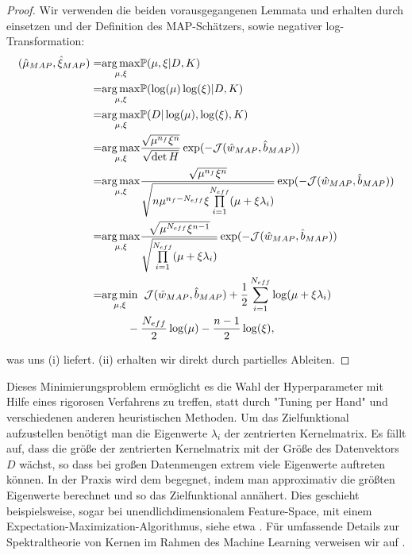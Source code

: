 \documentclass{report}
\theoremstyle{linebreak}
\begin{document}
\begin{proof}
Wir verwenden die beiden vorausgegangenen Lemmata und erhalten durch einsetzen und der Definition des MAP-Schätzers, sowie negativer log-Transformation:
\begin{align*}
	(\hat{\mu}_{MAP}, \hat{\xi}_{MAP}) 
	=& \underset{\mu, \xi}{\arg \max} \mathbb{P}(\mu, \xi \vert D, K) \\
	=& \underset{\mu, \xi}{\arg \max} \mathbb{P}(\log(\mu) \log(\xi) \vert D, K) \\
	=& \underset{\mu, \xi}{\arg \max} \mathbb{P}(D \vert \log(\mu), \log(\xi), K) \\
	=& \underset{\mu, \xi}{\arg \max} \frac{\sqrt{\mu^{n_f} \xi^n}}	{\sqrt{\det H}} 				\exp(- \mathcal{J}(\hat{w}_{MAP},\hat{b}_{MAP})) \\
	=& \underset{\mu, \xi}{\arg \max} \frac{\sqrt{\mu^{n_f} \xi^n}}	{\sqrt{n \mu^{n_f - 			N_{eff}} \xi \underset{i=1}{\overset{N_{eff}}{\prod}}(\mu + 			\xi 				\lambda_i)}} \exp(- \mathcal{J}(\hat{w}_{MAP},\hat{b}_{MAP})) \\
	=& \underset{\mu, \xi}{\arg \max} \frac{\sqrt{\mu^{N_{eff}} \xi^{n-1}}}	{\sqrt{ 				\underset{i=1}{\overset{N_{eff}}{\prod}}(\mu + 	\xi	\lambda_i)}} \exp(- 					\mathcal{J}(\hat{w}_{MAP},\hat{b}_{MAP})) \\
	=& \underset{\mu, \xi}{\arg \min}  \hspace{0.2cm} \mathcal{J}(\hat{w}_{MAP}, 			   	 	\hat{b}_{MAP}) + \frac{1}{2}\sum_{i=1}^{N_{eff}}\log(\mu + \xi \lambda_i)\\
	 & \hspace{0.8cm}- \frac{N_{eff}}{2}\log(\mu) - \frac{n -1 }{2}\log(\xi),
\end{align*}

was uns (i) liefert. (ii) erhalten wir direkt durch partielles Ableiten.

\end{proof}

Dieses Minimierungsproblem ermöglicht es die Wahl der Hyperparameter mit Hilfe eines rigorosen Verfahrens zu treffen, statt durch "Tuning per Hand" und verschiedenen anderen heuristischen Methoden. Um das Zielfunktional aufzustellen benötigt man die Eigenwerte $\lambda_i$ der zentrierten Kernelmatrix. Es fällt auf, dass die größe der zentrierten Kernelmatrix mit der Größe des Datenvektors $D$ wächst, so dass bei großen Datenmengen extrem viele Eigenwerte auftreten können. In der Praxis wird dem begegnet, indem man approximativ die größten Eigenwerte berechnet und so das Zielfunktional annähert. Dies geschieht beispielsweise, sogar bei unendlichdimensionalem Feature-Space, mit einem Expectation-Maximization-Algorithmus, siehe etwa \cite{Kernel_PCA}. Für umfassende Details zur Spektraltheorie von Kernen im Rahmen des Machine Learning verweisen wir auf \cite{spectral_kernel}.
\end{document}
